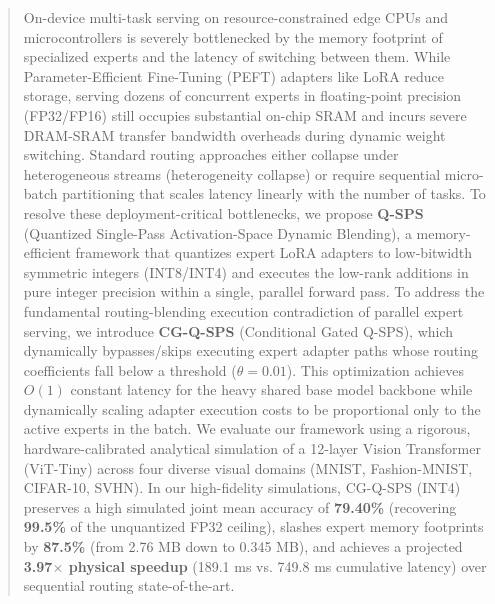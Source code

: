 \begin{abstract}
On-device multi-task serving on resource-constrained edge CPUs and microcontrollers is severely bottlenecked by the memory footprint of specialized experts and the latency of switching between them. While Parameter-Efficient Fine-Tuning (PEFT) adapters like LoRA reduce storage, serving dozens of concurrent experts in floating-point precision (FP32/FP16) still occupies substantial on-chip SRAM and incurs severe DRAM-SRAM transfer bandwidth overheads during dynamic weight switching. Standard routing approaches either collapse under heterogeneous streams (heterogeneity collapse) or require sequential micro-batch partitioning that scales latency linearly with the number of tasks. To resolve these deployment-critical bottlenecks, we propose \textbf{Q-SPS} (Quantized Single-Pass Activation-Space Dynamic Blending), a memory-efficient framework that quantizes expert LoRA adapters to low-bitwidth symmetric integers (INT8/INT4) and executes the low-rank additions in pure integer precision within a single, parallel forward pass. To address the fundamental routing-blending execution contradiction of parallel expert serving, we introduce \textbf{CG-Q-SPS} (Conditional Gated Q-SPS), which dynamically bypasses/skips executing expert adapter paths whose routing coefficients fall below a threshold ($\theta=0.01$). This optimization achieves $O(1)$ constant latency for the heavy shared base model backbone while dynamically scaling adapter execution costs to be proportional only to the active experts in the batch. We evaluate our framework using a rigorous, hardware-calibrated analytical simulation of a 12-layer Vision Transformer (ViT-Tiny) across four diverse visual domains (MNIST, Fashion-MNIST, CIFAR-10, SVHN). In our high-fidelity simulations, CG-Q-SPS (INT4) preserves a high simulated joint mean accuracy of \textbf{79.40\%} (recovering \textbf{99.5\%} of the unquantized FP32 ceiling), slashes expert memory footprints by \textbf{87.5\%} (from 2.76 MB down to 0.345 MB), and achieves a projected \textbf{3.97$\times$ physical speedup} (189.1 ms vs. 749.8 ms cumulative latency) over sequential routing state-of-the-art.
\end{abstract}
